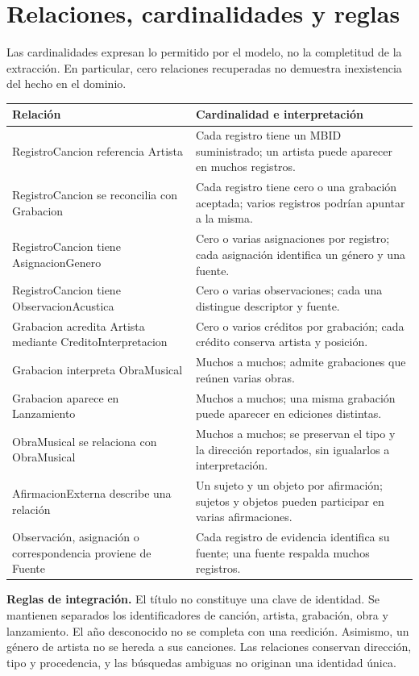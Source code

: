 \documentclass[11pt,a4paper]{article}
\begin{document}
\section{Relaciones, cardinalidades y reglas}
Las cardinalidades expresan lo permitido por el modelo, no la completitud de la extracción. En particular, cero relaciones recuperadas no demuestra inexistencia del hecho en el dominio.
\begin{center}\small
{}
\begin{tabularx}{\linewidth}{@{}Y p{5.6cm}@{}}
\toprule Relación & Cardinalidad e interpretación \\
\midrule
RegistroCancion referencia Artista & Cada registro tiene un MBID suministrado; un artista puede aparecer en muchos registros. \\
RegistroCancion se reconcilia con Grabacion & Cada registro tiene cero o una grabación aceptada; varios registros podrían apuntar a la misma. \\
RegistroCancion tiene AsignacionGenero & Cero o varias asignaciones por registro; cada asignación identifica un género y una fuente. \\
RegistroCancion tiene ObservacionAcustica & Cero o varias observaciones; cada una distingue descriptor y fuente. \\
Grabacion acredita Artista mediante CreditoInterpretacion & Cero o varios créditos por grabación; cada crédito conserva artista y posición. \\
Grabacion interpreta ObraMusical & Muchos a muchos; admite grabaciones que reúnen varias obras. \\
Grabacion aparece en Lanzamiento & Muchos a muchos; una misma grabación puede aparecer en ediciones distintas. \\
ObraMusical se relaciona con ObraMusical & Muchos a muchos; se preservan el tipo y la dirección reportados, sin igualarlos a interpretación. \\
AfirmacionExterna describe una relación & Un sujeto y un objeto por afirmación; sujetos y objetos pueden participar en varias afirmaciones. \\
Observación, asignación o correspondencia proviene de Fuente & Cada registro de evidencia identifica su fuente; una fuente respalda muchos registros. \\
\bottomrule
\end{tabularx}
\end{center}

\textbf{Reglas de integración.} El título no constituye una clave de identidad. Se mantienen separados los identificadores de canción, artista, grabación, obra y lanzamiento. El año desconocido no se completa con una reedición. Asimismo, un género de artista no se hereda a sus canciones. Las relaciones conservan dirección, tipo y procedencia, y las búsquedas ambiguas no originan una identidad única.
\end{document}

